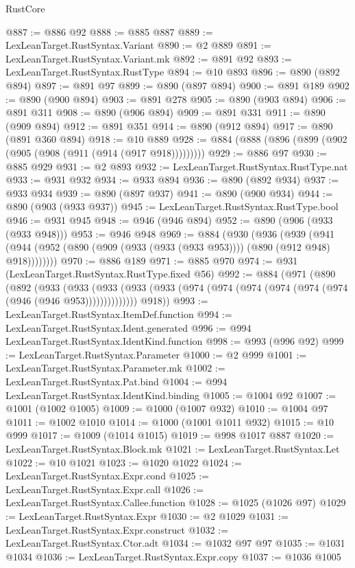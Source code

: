 \begin{lexlean}{RustCore}
\begin{coremodule}
@887 := @886 @92
@888 := @885 @887
@889 := LexLeanTarget.RustSyntax.Variant
@890 := @2 @889
@891 := LexLeanTarget.RustSyntax.Variant.mk
@892 := @891 @92
@893 := LexLeanTarget.RustSyntax.RustType
@894 := @10 @893
@896 := @890 (@892 @894)
@897 := @891 @97
@899 := @890 (@897 @894)
@900 := @891 @189
@902 := @890 (@900 @894)
@903 := @891 @278
@905 := @890 (@903 @894)
@906 := @891 @311
@908 := @890 (@906 @894)
@909 := @891 @331
@911 := @890 (@909 @894)
@912 := @891 @351
@914 := @890 (@912 @894)
@917 := @890 (@891 @360 @894)
@918 := @10 @889
@928 := @884 (@888 (@896 (@899 (@902 (@905 (@908 (@911 (@914 (@917 @918)))))))))
@929 := @886 @97
@930 := @885 @929
@931 := @2 @893
@932 := LexLeanTarget.RustSyntax.RustType.nat
@933 := @931 @932
@934 := @933 @894
@936 := @890 (@892 @934)
@937 := @933 @934
@939 := @890 (@897 @937)
@941 := @890 (@900 @934)
@944 := @890 (@903 (@933 @937))
@945 := LexLeanTarget.RustSyntax.RustType.bool
@946 := @931 @945
@948 := @946 (@946 @894)
@952 := @890 (@906 (@933 (@933 @948)))
@953 := @946 @948
@969 := @884
    (@930
      (@936
        (@939
          (@941 (@944 (@952 (@890 (@909 (@933 (@933 (@933 @953)))) (@890 (@912 @948) @918))))))))
@970 := @886 @189
@971 := @885 @970
@974 := @931 (LexLeanTarget.RustSyntax.RustType.fixed @56)
@992 := @884
    (@971
      (@890
        (@892
          (@933
            (@933
              (@933 (@933 (@933 (@974 (@974 (@974 (@974 (@974 (@974 (@946 (@946 @953))))))))))))))
        @918))
@993 := LexLeanTarget.RustSyntax.ItemDef.function
@994 := LexLeanTarget.RustSyntax.Ident.generated
@996 := @994 LexLeanTarget.RustSyntax.IdentKind.function
@998 := @993 (@996 @92)
@999 := LexLeanTarget.RustSyntax.Parameter
@1000 := @2 @999
@1001 := LexLeanTarget.RustSyntax.Parameter.mk
@1002 := LexLeanTarget.RustSyntax.Pat.bind
@1004 := @994 LexLeanTarget.RustSyntax.IdentKind.binding
@1005 := @1004 @92
@1007 := @1001 (@1002 @1005)
@1009 := @1000 (@1007 @932)
@1010 := @1004 @97
@1011 := @1002 @1010
@1014 := @1000 (@1001 @1011 @932)
@1015 := @10 @999
@1017 := @1009 (@1014 @1015)
@1019 := @998 @1017 @887
@1020 := LexLeanTarget.RustSyntax.Block.mk
@1021 := LexLeanTarget.RustSyntax.Let
@1022 := @10 @1021
@1023 := @1020 @1022
@1024 := LexLeanTarget.RustSyntax.Expr.cond
@1025 := LexLeanTarget.RustSyntax.Expr.call
@1026 := LexLeanTarget.RustSyntax.Callee.function
@1028 := @1025 (@1026 @97)
@1029 := LexLeanTarget.RustSyntax.Expr
@1030 := @2 @1029
@1031 := LexLeanTarget.RustSyntax.Expr.construct
@1032 := LexLeanTarget.RustSyntax.Ctor.adt
@1034 := @1032 @97 @97
@1035 := @1031 @1034
@1036 := LexLeanTarget.RustSyntax.Expr.copy
@1037 := @1036 @1005

\end{coremodule}
\end{lexlean}
